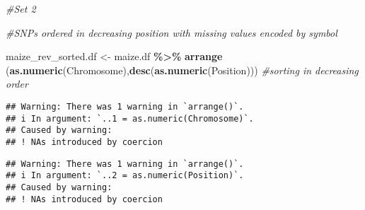 \documentclass[
]{article}
\newenvironment{Shaded}{\begin{snugshade}}{\end{snugshade}}
\newcommand{\CommentTok}[1]{\textcolor[rgb]{0.56,0.35,0.01}{\textit{#1}}}
\newcommand{\FunctionTok}[1]{\textcolor[rgb]{0.13,0.29,0.53}{\textbf{#1}}}
\newcommand{\NormalTok}[1]{#1}
\newcommand{\OtherTok}[1]{\textcolor[rgb]{0.56,0.35,0.01}{#1}}
\newcommand{\SpecialCharTok}[1]{\textcolor[rgb]{0.81,0.36,0.00}{\textbf{#1}}}
\begin{document}
\begin{Shaded}
\begin{Highlighting}[]
\CommentTok{\#Set 2}

\CommentTok{\#SNPs ordered in decreasing position with missing values encoded by \textquotesingle{}{-}\textquotesingle{} symbol}

\NormalTok{maize\_rev\_sorted.df }\OtherTok{\textless{}{-}}\NormalTok{ maize.df }\SpecialCharTok{\%\textgreater{}\%}
  \FunctionTok{arrange}\NormalTok{ (}\FunctionTok{as.numeric}\NormalTok{(Chromosome),}\FunctionTok{desc}\NormalTok{(}\FunctionTok{as.numeric}\NormalTok{(Position)))   }\CommentTok{\#sorting in decreasing order}
\end{Highlighting}
\end{Shaded}

\begin{verbatim}
## Warning: There was 1 warning in `arrange()`.
## i In argument: `..1 = as.numeric(Chromosome)`.
## Caused by warning:
## ! NAs introduced by coercion
\end{verbatim}

\begin{verbatim}
## Warning: There was 1 warning in `arrange()`.
## i In argument: `..2 = as.numeric(Position)`.
## Caused by warning:
## ! NAs introduced by coercion
\end{verbatim}
\end{document}
